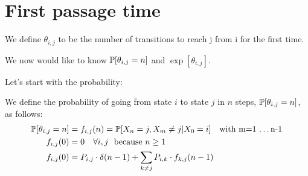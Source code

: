 \section{First passage time}
\begin{definition}[$\theta_{i,j}$]
We define $\theta_{i,j}$ to be the number of transitions to reach j from i for the first time.
\end{definition}
We now would like to know $\mathbb{P}[\theta_{i,j}=n]$ and $\exp[\theta_{i,j}]$.

Let's start with the probability:
\begin{definition}
	We define the probability of going from state $i$ to state $j$ in $n$ steps, $\mathbb{P}[\theta_{i,j}=n]$, as follows:
	\begin{equation}\begin{split}
		\mathbb{P}[\theta_{i,j}=n] &= f_{i,j}(n)=\mathbb{P}[X_n=j,X_m \neq j | X_0 = i] \quad \text{with m=1 \dots n-1}\\
		f_{i,j}(0)&=0 \quad \forall i,j \,\, \text{ because $n \ge 1$}\\
		f_{i,j}(0)&=P_{i,j} \cdot \delta(n-1) + \sum\limits_{k \neq j} P_{i,k} \cdot f_{k,j}(n-1)\\
	\end{split}\end{equation}
\end{definition}
